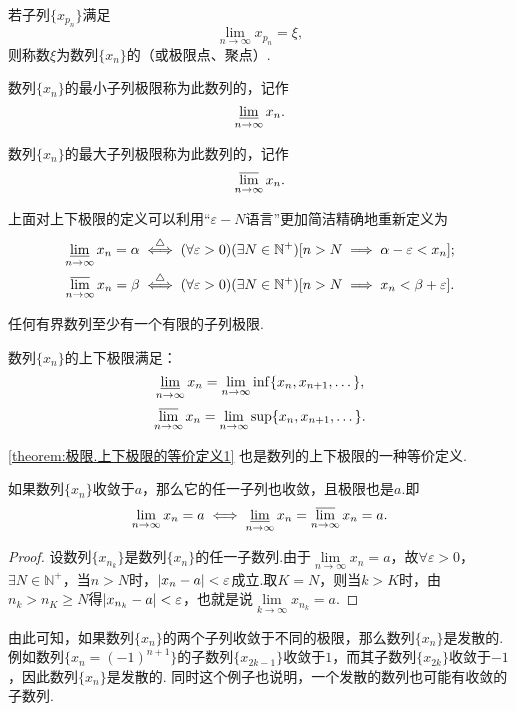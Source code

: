 \begin{definition}
若子列\(\{x_{p_n}\}\)满足\[
\lim\limits_{n\to\infty} x_{p_n} = \xi,
\]则称数\(\xi\)为数列\(\{x_n\}\)的（或极限点、聚点）.

数列\(\{x_n\}\)的最小子列极限称为此数列的，记作\[
\varliminf\limits_{n\to\infty} x_n.
\]

数列\(\{x_n\}\)的最大子列极限称为此数列的，记作\[
\varlimsup\limits_{n\to\infty} x_n.
\]
\end{definition}
上面对上下极限的定义可以利用“\(\varepsilon-N\)语言”更加简洁精确地重新定义为\begin{align*}
	\varliminf\limits_{n\to\infty} x_n = \alpha
	&\overset{\triangle}{\iff}
	(\forall\varepsilon>0)
	(\exists N\in\mathbb{N}^+)
	[n>N \implies \alpha-\varepsilon < x_n]; \\
	\varlimsup\limits_{n\to\infty} x_n = \beta
	&\overset{\triangle}{\iff}
	(\forall\varepsilon>0)
	(\exists N\in\mathbb{N}^+)
	[n>N \implies x_n < \beta+\varepsilon].
\end{align*}

\begin{theorem}\label{theorem:极限.波尔查诺-魏尔斯特拉斯原理}
任何有界数列至少有一个有限的子列极限.
\end{theorem}

\begin{theorem}\label{theorem:极限.上下极限的等价定义1}
数列\(\{x_n\}\)的上下极限满足：\[
	\varliminf\limits_{n\to\infty} x_n = \lim\limits_{n\to\infty} \inf\{x_n,x_{n+1},\dotsc\},
\]\[
	\varlimsup\limits_{n\to\infty} x_n = \lim\limits_{n\to\infty} \sup\{x_n,x_{n+1},\dotsc\}.
\]
\end{theorem}
\cref{theorem:极限.上下极限的等价定义1}
也是数列的上下极限的一种等价定义.

\begin{theorem}[收敛数列与其子列的关系]
如果数列\(\{x_n\}\)收敛于\(a\)，那么它的任一子列也收敛，且极限也是\(a\).即\[
\lim\limits_{n\to\infty} x_n = a
\iff
\varliminf\limits_{n\to\infty} x_n = \varlimsup\limits_{n\to\infty} x_n = a.
\]
\begin{proof}
设数列\(\{x_{n_k}\}\)是数列\(\{x_n\}\)的任一子数列.由于\(\lim\limits_{n\to\infty}x_n = a\)，故\(\forall \varepsilon > 0\)，\(\exists N \in \mathbb{N}^+\)，当\(n > N\)时，\(\abs{x_n - a} < \varepsilon\)成立.取\(K = N\)，则当\(k > K\)时，由\(n_k > n_K \geq N\)得\(\abs{x_{n_k} - a} < \varepsilon\)，也就是说\(\lim\limits_{k\to\infty}x_{n_k} = a\).
\end{proof}
\end{theorem}
由此可知，如果数列\(\{x_n\}\)的两个子列收敛于不同的极限，那么数列\(\{x_n\}\)是发散的.
例如数列\(\{x_n=(-1)^{n+1}\}\)的子数列\(\{x_{2k-1}\}\)收敛于\(1\)，而其子数列\(\{x_{2k}\}\)收敛于\(-1\)，因此数列\(\{x_n\}\)是发散的.
同时这个例子也说明，一个发散的数列也可能有收敛的子数列.

